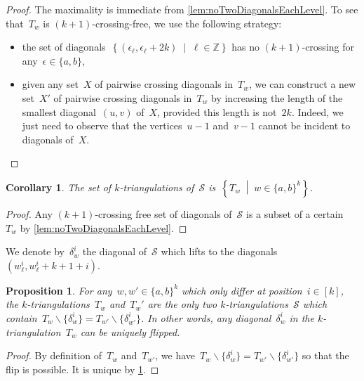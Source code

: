 \documentclass{amsart}
\newtheorem{proposition}[theorem]{Proposition}
\newtheorem{corollary}[theorem]{Corollary}
\theoremstyle{remark}
\newcommand{\Z}{\mathbb{Z}} %
\newcommand{\set}[2]{\left\{ #1 \;\middle|\; #2 \right\}} %
\newcommand{\ssm}{\smallsetminus} %
\newcommand{\surface}{\mathcal{S}}
\begin{document}
\begin{proof}
The maximality is immediate from \cref{lem:noTwoDiagonalsEachLevel}.
To see that~$T_w$ is $(k+1)$-crossing-free, we use the following strategy:
\begin{itemize}
\item the set of diagonals~$\set{(\epsilon_\ell, \epsilon_\ell+2k)}{\ell \in \Z}$ has no $(k+1)$-crossing for any~$\epsilon \in \{a,b\}$,
\item given any set~$X$ of pairwise crossing diagonals in~$T_w$, we can construct a new set~$X'$ of pairwise crossing diagonals in~$T_w$ by increasing the length of the smallest diagonal~$(u,v)$ of~$X$, provided this length is not~$2k$. Indeed, we just need to observe that the vertices~$u-1$ and~$v-1$ cannot be incident to diagonals of~$X$.
\qedhere
\end{itemize}
\end{proof}

\begin{corollary}
\label{coro:allkTriangCyclinder}
The set of $k$-triangulations of~$\surface$ is~$\set{T_w}{w \in \{a,b\}^k}$.
\end{corollary}

\begin{proof}
Any $(k+1)$-crossing free set of diagonals of~$\surface$ is a subset of a certain~$T_w$ by \cref{lem:noTwoDiagonalsEachLevel}.
\end{proof}

We denote by~$\delta_w^i$ the diagonal of~$\surface$ which lifts to the diagonals~$(w^i_\ell, w^i_{\ell}+k+1+i)$.

\begin{proposition}
For any~$w, w' \in \{a,b\}^k$ which only differ at position~$i \in [k]$, the $k$-triangulations~$T_w$ and~$T_w'$ are the only two $k$-triangulations~$\surface$ which contain~${T_w \ssm \{\delta_w^i\} = T_{w'} \ssm \{\delta_{w'}^i\}}$. In other words, any diagonal~$\delta_w^i$ in the $k$-triangulation~$T_w$ can be uniquely flipped.
\end{proposition}

\begin{proof}
By definition of~$T_w$ and~$T_{w'}$, we have~${T_w \ssm \{\delta_w^i\} = T_{w'} \ssm \{\delta_{w'}^i\}}$ so that the flip is possible.
It is unique by \cref{coro:allkTriangCyclinder}.
\end{proof}
\end{document}
